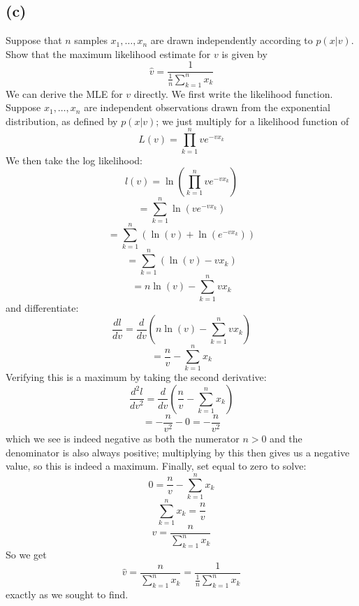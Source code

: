 \documentclass{article}
\begin{document}
{\subsection*{(c)}
Suppose that \(n\) samples \(x_1, \dots, x_n\) are drawn independently according to \(p(x|v)\). Show that the maximum likelihood estimate for \(v\) is given by 
\[
  \hat{v} = \frac{1}{\frac{1}{n} \sum_{k=1}^n x_k}
\]
We can derive the MLE for \(v\) directly. We first write the likelihood function. Suppose \(x_1, \dots, x_n\) are independent observations drawn from the exponential distribution, as defined by \(p(x|v)\); we just multiply for a likelihood function of 
\[
  L(v) = \prod_{k=1}^{n} v e^{-vx_k}
\]
We then take the log likelihood:
\[
  l(v) = \ln(\prod_{k=1}^{n} v e^{-vx_k})
\]
\[
  = \sum_{k=1}^{n} \ln(v e^{-vx_k})
\]
\[
  = \sum_{k=1}^{n} (\ln(v) + \ln(e^{-vx_k}))
\]
\[
  = \sum_{k=1}^{n} (\ln(v) - vx_k)
\]
\[
  = n\ln(v) - \sum_{k=1}^{n} vx_k
\]
and differentiate:
\[
  \frac{dl}{dv} = \frac{d}{dv} (n\ln(v) - \sum_{k=1}^{n} vx_k)
\]
\[
  = \frac{n}{v} - \sum_{k=1}^{n} x_k
\]
Verifying this is a maximum by taking the second derivative:
\[
  \frac{d^2l}{dv^2} = \frac{d}{dv} (\frac{n}{v} - \sum_{k=1}^{n} x_k) 
\]
\[
  = -\frac{n}{v^2} - 0 = -\frac{n}{v^2}
\]
which we see is indeed negative as both the numerator \(n > 0\) and the denominator is also always positive; multiplying by this then gives us a negative value, so this is indeed a maximum.
Finally, set equal to zero to solve:
\[
  0 = \frac{n}{v} - \sum_{k=1}^{n} x_k
\]
\[
  \sum_{k=1}^{n} x_k = \frac{n}{v}
\]
\[
  v = \frac{n}{\sum_{k=1}^{n} x_k}
\]
So we get 
\[
  \hat{v} =  \frac{n}{\sum_{k=1}^{n} x_k} = \frac{1}{\frac{1}{n}\sum_{k=1}^{n} x_k}
\]
exactly as we sought to find.

}
\end{document}
